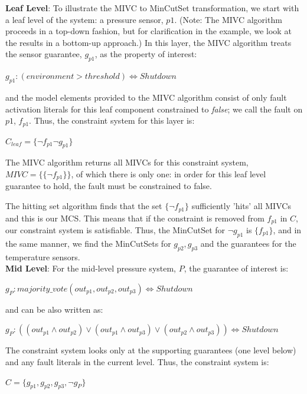 \textbf{Leaf Level}: To illustrate the MIVC to MinCutSet transformation, we start with a leaf level of the system: a pressure sensor, $p1$. (Note: The MIVC algorithm proceeds in a top-down fashion, but for clarification in the example, we look at the results in a bottom-up approach.)  In this layer, the MIVC algorithm treats the sensor guarantee, $g_{p1}$, as the property of interest:
\begin{center}
    $g_{p1} : (environment > threshold) \iff Shutdown$
\end{center}
and the model elements provided to the MIVC algorithm consist of only fault activation literals for this leaf component constrained to \textit{false}; we call the fault on $p1$, $f_{p1}$. Thus, the constraint system for this layer is: 
\begin{center}
    $C_{leaf} = \{\neg f_{p1} \neg g_{p1}\}$
\end{center}

The MIVC algorithm returns all MIVCs for this constraint system, $MIVC = \{\{\neg f_{p1}\}\}$, of which there is only one: in order for this leaf level guarantee to hold, the fault must be constrained to false. 

The hitting set algorithm finds that the set $\{\neg f_{p1}\}$ sufficiently 'hits' all MIVCs and this is our MCS. This means that if the constraint is removed from $f_{p1}$ in $C$, our constraint system is satisfiable. Thus, the MinCutSet for $\neg g_{p1}$ is $\{f_{p1}\}$, and in the same manner, we find the MinCutSets for $g_{p2}, g_{p3}$ and the guarantees for the temperature sensors. \\

\textbf{Mid Level}: For the mid-level pressure system, $P$, the guarantee of interest is: 
\begin{center}
    $g_P : majority\_vote(out_{p1}, out_{p2}, out_{p3}) \iff Shutdown$
\end{center}
and can be also written as: 
\begin{center}
    $g_P: ((out_{p1} \land out_{p2}) \lor (out_{p1} \land out_{p3}) \lor (out_{p2} \land out_{p3})) \iff Shutdown$
\end{center}

The constraint system looks only at the supporting guarantees (one level below) and any fault literals in the current level. Thus, the constraint system is: 
\begin{center}
    $C = \{g_{p1}, g_{p2}, g_{p3}, \neg g_P\}$
\end{center}

